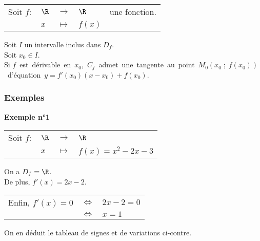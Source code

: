 \begin{tabular}{lllll}
\hspace{-.3cm} Soit $f:$ & $\R$ & $\longrightarrow$ & $\R$ & une fonction. \\
& $x$ & $\longmapsto$ & $f(x)$ & \\
\end{tabular}

\vspace*{.3cm}

Soit $I$ un intervalle inclus dans $D_f$. \\
Soit $x_0 \in I$. \\

Si \hbox{$f$ est dérivable en $x_0$, $C_f$ admet une tangente au point $M_0\left(x_0 \; ; \; f\left(x_0\right)\right)$ d'équation $y = f'\left(x_0\right)\left(x-x_0\right) + f\left(x_0\right)$.}

\subsubsection{Exemples}

\textbf{Exemple n°1} \\

\begin{tabular}{llll}
\hspace*{-.3cm} Soit $f:$ & $\R$ & $\longrightarrow$ & $\R$ \\
& $x$ & $\longmapsto$ & $f(x) = x^2 - 2x - 3$ \\
\end{tabular}

\vspace*{.3cm}

On a $D_f = \R$. \\

De plus, $f'(x) = 2x - 2$. \\

\begin{tabular}{lll}
\hspace*{-.3cm} Enfin, $f'(x) = 0$ & $\Longleftrightarrow$ & $2x - 2 = 0$ \\
& $\Longleftrightarrow$ & $x = 1$ \\
\end{tabular}

\vspace*{.3cm}

On en déduit le tableau de signes et de variations ci-contre. \\



